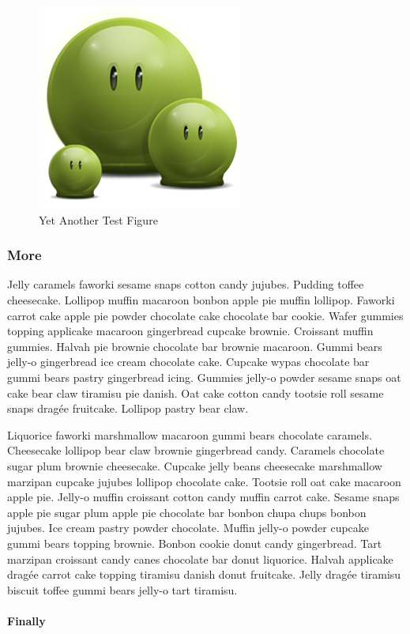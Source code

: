 \documentclass{uumthesis}
\begin{document}
\begin{figure}[hbt!]\centering
   \includegraphics[width=.3\textwidth]{green} 
   \caption{Yet Another Test Figure}
   \label{fig:dummy}
\end{figure}


\subsubsection{More}

Jelly caramels faworki sesame snaps cotton candy jujubes. Pudding toffee cheesecake. Lollipop muffin macaroon bonbon apple pie muffin lollipop. Faworki carrot cake apple pie powder chocolate cake chocolate bar cookie. Wafer gummies topping applicake macaroon gingerbread cupcake brownie. Croissant muffin gummies. Halvah pie brownie chocolate bar brownie macaroon. Gummi bears jelly-o gingerbread ice cream chocolate cake. Cupcake wypas chocolate bar gummi bears pastry gingerbread icing. Gummies jelly-o powder sesame snaps oat cake bear claw tiramisu pie danish. Oat cake cotton candy tootsie roll sesame snaps dragée fruitcake. Lollipop pastry bear claw.

Liquorice faworki marshmallow macaroon gummi bears chocolate caramels. Cheesecake lollipop bear claw brownie gingerbread candy. Caramels chocolate sugar plum brownie cheesecake. Cupcake jelly beans cheesecake marshmallow marzipan cupcake jujubes lollipop chocolate cake. Tootsie roll oat cake macaroon apple pie. Jelly-o muffin croissant cotton candy muffin carrot cake. Sesame snaps apple pie sugar plum apple pie chocolate bar bonbon chupa chups bonbon jujubes. Ice cream pastry powder chocolate. Muffin jelly-o powder cupcake gummi bears topping brownie. Bonbon cookie donut candy gingerbread. Tart marzipan croissant candy canes chocolate bar donut liquorice. Halvah applicake dragée carrot cake topping tiramisu danish donut fruitcake. Jelly dragée tiramisu biscuit toffee gummi bears jelly-o tart tiramisu.

\paragraph{Finally}
\end{document}
